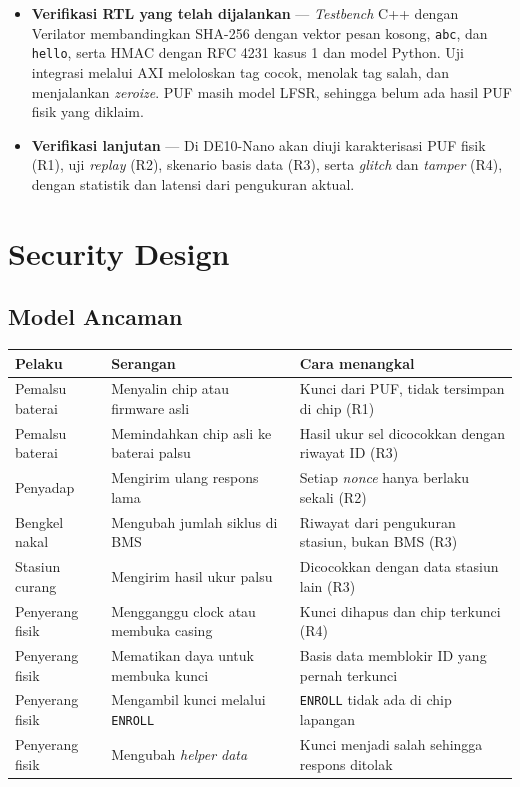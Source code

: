 \documentclass[11pt,a4paper]{article}
\newcommand{\hdr}[1]{\cellcolor{hdrgreen}\textbf{#1}}
\renewcommand{\arraystretch}{1.3}
\begin{document}
\begin{itemize}
  \item \textbf{Verifikasi RTL yang telah dijalankan} --- \emph{Testbench} C++ dengan Verilator membandingkan SHA-256 dengan vektor pesan kosong, \texttt{abc}, dan \texttt{hello}, serta HMAC dengan RFC 4231 kasus 1 dan model Python. Uji integrasi melalui AXI meloloskan tag cocok, menolak tag salah, dan menjalankan \emph{zeroize}. PUF masih model LFSR, sehingga belum ada hasil PUF fisik yang diklaim.
  \item \textbf{Verifikasi lanjutan} --- Di DE10-Nano akan diuji karakterisasi PUF fisik (R1), uji \emph{replay} (R2), skenario basis data (R3), serta \emph{glitch} dan \emph{tamper} (R4), dengan statistik dan latensi dari pengukuran aktual.
\end{itemize}

\section{Security Design}

\subsection{Model Ancaman}

\begin{center}
\footnotesize
\renewcommand{\arraystretch}{1.2}
\begin{tabularx}{\linewidth}{|>{\raggedright\arraybackslash}p{2.3cm}|>{\raggedright\arraybackslash}X|>{\raggedright\arraybackslash}p{6.6cm}|}
\hline
\hdr{Pelaku} & \hdr{Serangan} & \hdr{Cara menangkal} \\ \hline
Pemalsu baterai & Menyalin chip atau firmware asli & Kunci dari PUF, tidak tersimpan di chip (R1) \\ \hline
Pemalsu baterai & Memindahkan chip asli ke baterai palsu & Hasil ukur sel dicocokkan dengan riwayat ID (R3) \\ \hline
Penyadap & Mengirim ulang respons lama & Setiap \emph{nonce} hanya berlaku sekali (R2) \\ \hline
Bengkel nakal & Mengubah jumlah siklus di BMS & Riwayat dari pengukuran stasiun, bukan BMS (R3) \\ \hline
Stasiun curang & Mengirim hasil ukur palsu & Dicocokkan dengan data stasiun lain (R3) \\ \hline
Penyerang fisik & Mengganggu clock atau membuka casing & Kunci dihapus dan chip terkunci (R4) \\ \hline
Penyerang fisik & Mematikan daya untuk membuka kunci & Basis data memblokir ID yang pernah terkunci \\ \hline
Penyerang fisik & Mengambil kunci melalui \texttt{ENROLL} & \texttt{ENROLL} tidak ada di chip lapangan \\ \hline
Penyerang fisik & Mengubah \emph{helper data} & Kunci menjadi salah sehingga respons ditolak \\ \hline
\end{tabularx}
\end{center}
\end{document}
